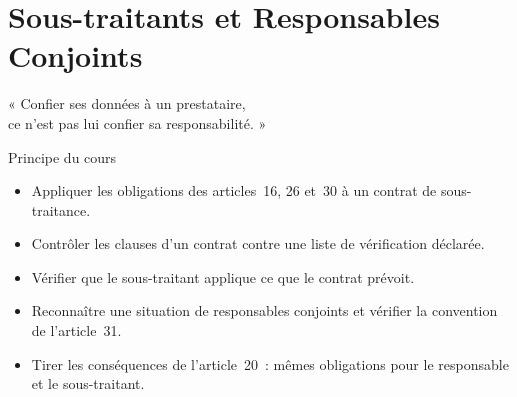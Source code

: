 
\chapter{Sous-traitants et Responsables Conjoints}
\label{chap:soustraitants}

\epigraph{%
    « Confier ses données à un prestataire,\\
    ce n'est pas lui confier sa responsabilité. »%
}{Principe du cours}


\begin{boxobjectifs}
\begin{itemize}
    \item Appliquer les obligations des articles~16, 26 et~30 à un contrat
          de sous-traitance.
    \item Contrôler les clauses d'un contrat contre une liste de vérification
          déclarée.
    \item Vérifier que le sous-traitant applique ce que le contrat prévoit.
    \item Reconnaître une situation de responsables conjoints et vérifier la
          convention de l'article~31.
    \item Tirer les conséquences de l'article~20~: mêmes obligations pour le
          responsable et le sous-traitant.
\end{itemize}
\end{boxobjectifs}

\bigskip

